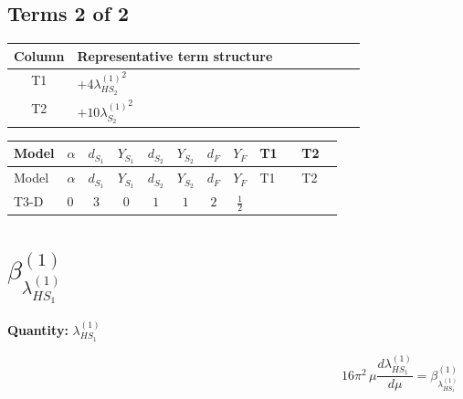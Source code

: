 \documentclass[8pt]{article}
\begin{document}
\begin{landscape}
\subsection*{Terms 2 of 2}
\begin{center}
\begin{tabular}{@{}c >{\raggedright\arraybackslash}p{0.82\linewidth}@{}}
\toprule
Column & Representative term structure \\
\midrule
T1 & \(\displaystyle +4 {\lambda_{HS_2}^{(1)}}^2\) \\
\midrule
T2 & \(\displaystyle +10 {\lambda_{S_2}^{(1)}}^2\) \\
\midrule
\bottomrule
\end{tabular}
\end{center}
\smallskip
\tiny
\begin{longtable}{@{}llcccccc >{\raggedright\arraybackslash}p{0.21\linewidth} >{\raggedright\arraybackslash}p{0.21\linewidth}@{}}
\toprule
Model & $\alpha$ & $d_{S_1}$ & $Y_{S_1}$ & $d_{S_2}$ & $Y_{S_2}$ & $d_F$ & $Y_F$ & T1 & T2 \\
\midrule
\endfirsthead
\toprule
Model & $\alpha$ & $d_{S_1}$ & $Y_{S_1}$ & $d_{S_2}$ & $Y_{S_2}$ & $d_F$ & $Y_F$ & T1 & T2 \\
\midrule
\endhead
T3-D & $0$ & $3$ & $0$ & $1$ & $1$ & $2$ & $\frac{1}{2}$ & \scriptsize\adjustbox{max width=\linewidth}{$\begin{gathered} +4 {\lambda_{HS_2}^{(1)}}^2\end{gathered}$} & \scriptsize\adjustbox{max width=\linewidth}{$\begin{gathered} +10 {\lambda_{S_2}^{(1)}}^2\end{gathered}$} \\
\midrule
\bottomrule
\end{longtable}
\clearpage
\section*{$\beta_{\lambda_{HS_1}^{(1)}}^{(1)}$}
\noindent\textbf{Quantity: }$\lambda_{HS_1}^{(1)}$\par\smallskip
\[16\pi^2\,\mu\frac{d \lambda_{HS_1}^{(1)}}{d\mu}=\beta_{\lambda_{HS_1}^{(1)}}^{(1)}\]

\end{landscape}
\end{document}
